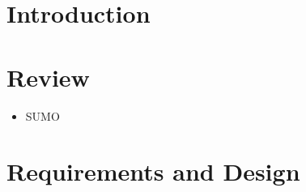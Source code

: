 

\section{Introduction}

\section{Review}

\begin{itemize}
    \item SUMO
\end{itemize}

\section{Requirements and Design}

